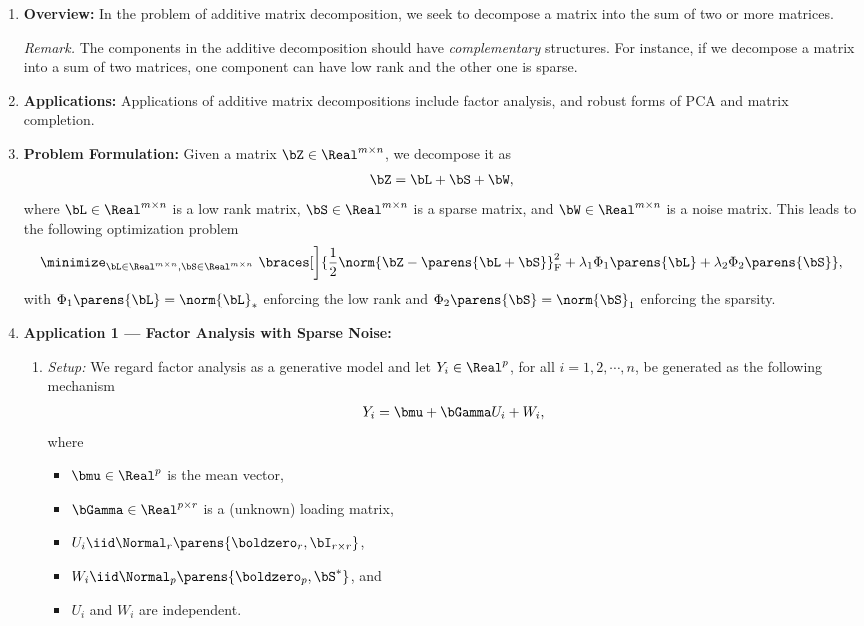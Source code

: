 \documentclass[12pt]{article}
\begin{document}
\begin{enumerate}[label=\textbf{\arabic*.}]
	
	\item \textbf{Overview:} In the problem of additive matrix decomposition, we seek to decompose a matrix into the sum of two or more matrices. 
	
	\textit{Remark.} The components in the additive decomposition should have \emph{complementary} structures. For instance, if we decompose a matrix into a sum of two matrices, one component can have low rank and the other one is sparse. 
	
	\item \textbf{Applications:} Applications of additive matrix decompositions include factor analysis, and robust forms of PCA and matrix completion. 
	
	\item \textbf{Problem Formulation:} Given a matrix $\bZ \in \Real^{m \times n}$, we decompose it as 
	\begin{align*}
		\bZ = \bL + \bS + \bW, 
	\end{align*}
	where $\bL \in \Real^{m \times n}$ is a low rank matrix, $\bS \in \Real^{m \times n}$ is a sparse matrix, and $\bW \in \Real^{m \times n}$ is a noise matrix. This leads to the following optimization problem 
	\begin{align}\label{eq-additive-matrix-decom}
		\minimize_{\bL \in \Real^{m \times n}, \bS \in \Real^{m \times n}} \ \braces[\bigg]{\frac{1}{2} \norm{\bZ - \parens{\bL + \bS}}_{\mathrm{F}}^2 + \lambda_1 \Phi_1 \parens{\bL} + \lambda_2 \Phi_2 \parens{\bS}}, 
	\end{align}
	with $\Phi_1 \parens{\bL} = \norm{\bL}_*$ enforcing the low rank and $\Phi_2 \parens{\bS} = \norm{\bS}_1$ enforcing the sparsity. 
	
	\item \textbf{Application 1 --- Factor Analysis with Sparse Noise:} 
	\begin{enumerate}
		\item \textit{Setup:} We regard factor analysis as a generative model and let $Y_i \in \Real^p$, for all $i = 1, 2, \cdots, n$, be generated as the following mechanism 
		\begin{align}\label{eq-factor-model}
			Y_i = \bmu + \bGamma U_i + W_i, 
		\end{align}
		where 
		\begin{itemize}
			\item $\bmu \in \Real^p$ is the mean vector, 
			\item $\bGamma \in \Real^{p \times r}$ is a (unknown) loading matrix, 
			\item $U_i \iid \Normal_r \parens{\boldzero_r, \bI_{r \times r}}$, 
			\item $W_i \iid \Normal_p \parens{\boldzero_p, \bS^*}$, and 
			\item $U_i$ and $W_i$ are independent. 
		\end{itemize}
		

\end{enumerate}
\end{enumerate}
\end{document}
